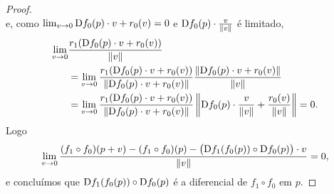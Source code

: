 \begin{proof}
\begin{equation*}
	\end{equation*}
e, como $\lim_{v \rightarrow 0} \mathrm{D} f_0(p) \cdot v + r_0(v) = 0$ e $\mathrm{D} f_0(p) \cdot \frac{v}{\left\Vert{v}\right\Vert}$ é limitado,
	\begin{align*}
	\lim_{v \rightarrow 0} &\frac{r_1(\mathrm{D} f_0(p) \cdot v + r_0(v))}{\left\Vert{v}\right\Vert} \\
		&= \lim_{v \rightarrow 0} \frac{r_1(\mathrm{D} f_0(p) \cdot v + r_0(v))}{\left\Vert{\mathrm{D}f_0(p) \cdot v + r_0(v)}\right\Vert} \frac{\left\Vert{\mathrm{D}f_0(p) \cdot v + r_0(v)}\right\Vert}{\left\Vert{v}\right\Vert}\\
		&= \lim_{v \rightarrow 0} \frac{r_1(\mathrm{D} f_0(p) \cdot v + r_0(v))}{\left\Vert{\mathrm{D}f_0(p) \cdot v + r_0(v)}\right\Vert} \left\Vert{\mathrm{D}f_0(p) \cdot \frac{v}{\left\Vert{v}\right\Vert}+ \frac{r_0(v)}{\left\Vert{v}\right\Vert}}\right\Vert = 0.
	\end{align*}
Logo
	\begin{equation*}
	\lim_{v \rightarrow 0} \frac{(f_1 \circ f_0)(p+v) - (f_1 \circ f_0)(p) - \big(\mathrm{D} f_1(f_0(p)) \circ \mathrm{D} f_0(p)\big) \cdot v}{\left\Vert{v}\right\Vert} = 0,
	\end{equation*}
e concluímos que $\mathrm{D} f_1(f_0(p)) \circ \mathrm{D} f_0(p)$ é a diferencial de $f_1 \circ f_0$ em $p$.
\end{proof}